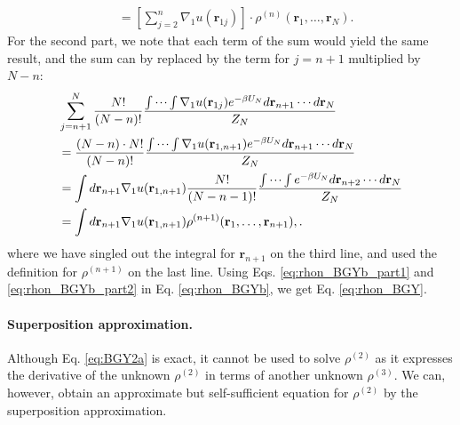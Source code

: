 \documentclass[twocolumn, 10pt]{article}
\numberwithin{equation}{section}
\newenvironment{solution}[1][\empty]
{\par\medskip\sffamily
  \textbf{\ifx\empty#1{Solution.}\relax\else{#1}\fi} \ignorespaces}
{\medskip}
\begin{document}
\begin{solution}
\begin{align}
  &=
  \left[
    \sum_{j=2}^n
    \nabla_1 u(\mathbf r_{1j})
  \right]
  \cdot
  \rho^{(n)}(\mathbf r_1, \dots, \mathbf r_N)
  .
  \label{eq:rhon_BGYb_part1}
\end{align}
%
For the second part,
we note that each term of the sum
would yield the same result,
and the sum can by replaced by the term for $j = n+1$
multiplied by $N-n$:
\begin{align}
  &\sum_{j=n+1}^N
  \frac{ N! } { (N-n)! }
  \frac{
    \idotsint
    \nabla_1 u(\mathbf r_{1j})
    e^{-\beta U_N} d\mathbf r_{n+1} \cdots d\mathbf r_N
  } { Z_N }
  \notag \\
  &=
  \frac{ (N-n) \cdot N! } { (N-n)! }
  \frac{
    \idotsint
    \nabla_1 u(\mathbf r_{1,n+1})
    e^{-\beta U_N} d\mathbf r_{n+1} \cdots d\mathbf r_N
  } { Z_N }
  \notag \\
  &=
  \int d\mathbf r_{n+1}
  \nabla_1 u(\mathbf r_{1,n+1})
  \frac{ N! } { (N-n-1)! }
  \frac{
    \idotsint
    e^{-\beta U_N} d\mathbf r_{n+2}\cdots d\mathbf r_N
  } { Z_N }
  \notag \\
  &=
  \int d\mathbf r_{n+1}
  \nabla_1 u(\mathbf r_{1,n+1})
  \rho^{(n+1)}(\mathbf r_1, \dots, \mathbf r_{n+1})
  ,
  .
  \label{eq:rhon_BGYb_part2}
\end{align}
where we have singled out the integral for $\mathbf r_{n+1}$
on the third line,
and used the definition for $\rho^{(n+1)}$
on the last line.
%
Using Eqs. \eqref{eq:rhon_BGYb_part1}
and \eqref{eq:rhon_BGYb_part2} in Eq. \eqref{eq:rhon_BGYb},
we get Eq. \eqref{eq:rhon_BGY}.
\end{solution}

\paragraph*{Superposition approximation.}

Although Eq. \eqref{eq:BGY2a} is exact,
it cannot be used to solve $\rho^{(2)}$
as it expresses the derivative of the unknown $\rho^{(2)}$
in terms of another unknown $\rho^{(3)}$.
%
We can, however, obtain an approximate but self-sufficient equation
for $\rho^{(2)}$ by the superposition approximation.
\end{document}
